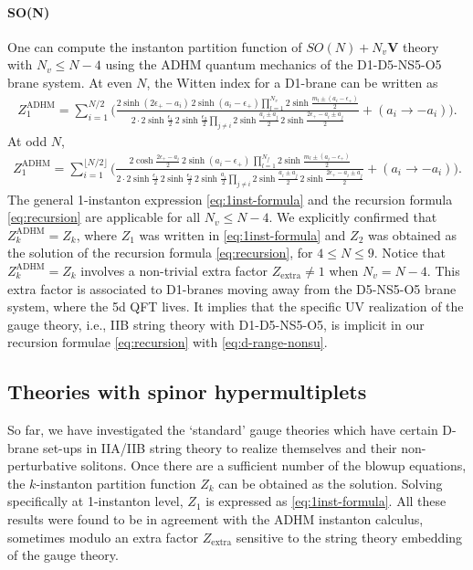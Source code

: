 \documentclass[letterpaper, 11pt]{article}
\def\e{\epsilon}
\begin{document}
{\paragraph{SO(N)} One can compute the instanton partition function of $SO(N) + N_v \mathbf{V}$  theory with $N_v \leq N-4$ using the ADHM quantum mechanics of the D1-D5-NS5-O5 brane system. At even $N$, the Witten index for a D1-brane can be written as
\begin{align}
Z_1^\text{ADHM} = \sum_{i=1}^{N/2}\bigg(\frac{2\sinh(2\e_+-a_i)\,2\sinh(a_i-\e_+)\prod_{l=1}^{N_v}2\sinh\frac{m_l\pm(a_i-\e_+)}{2}}{2 \cdot 2\sinh\frac{\e_1}{2}\,2\sinh\frac{\e_2}{2}\prod_{j\neq i}2\sinh\frac{a_i\pm a_j}{2}\,2\sinh\frac{2\e_+-a_i\pm a_j}{2}}+(a_i\rightarrow -a_i)\bigg).
\end{align}
At odd $N$,
\begin{align}
  Z_1^\text{ADHM} =\sum_{i=1}^{\lfloor N/2\rfloor}\bigg(\frac{2\cosh\frac{2\e_+-a_i}{2}\,2\sinh(a_i-\e_+)\,\prod_{l=1}^{N_f}2\sinh\frac{m_l\pm(a_i-\e_+)}{2}}{2 \cdot 2\sinh\frac{\e_1}{2}\,2\sinh\frac{\e_2}{2}\, 2\sinh\frac{a_i}{2}\prod_{j\neq i}2\sinh\frac{a_i\pm a_j}{2}\,2\sinh\frac{2\e_+-a_i\pm a_j}{2}}+(a_i\rightarrow -a_i)\bigg).
\end{align}
The general 1-instanton expression \eqref{eq:1inst-formula} and the recursion formula \eqref{eq:recursion} are applicable for all  $N_v \leq N-4$. We explicitly confirmed that $Z_k^\text{ADHM} = Z_k$, where $Z_1$ was written in \eqref{eq:1inst-formula} and $Z_2$ was obtained as the solution of the recursion formula \eqref{eq:recursion}, for $4 \leq N \leq 9$. Notice that $Z_k^\text{ADHM} = Z_k$ involves a non-trivial extra factor $Z_\text{extra} \neq 1$ when $N_v = N-4$. This extra factor is associated to D1-branes moving away from the D5-NS5-O5 brane system, where the 5d QFT lives. It implies that the specific UV realization of the gauge theory, i.e., IIB string theory with D1-D5-NS5-O5, is implicit in our  recursion formulae \eqref{eq:recursion} with \eqref{eq:d-range-nonsu}.
 

\subsection{Theories with spinor hypermultiplets}
\label{subsec:spinor}

So far, we have investigated the `standard' gauge theories which have certain D-brane set-ups in IIA/IIB string theory to realize themselves and their non-perturbative solitons. Once there are a sufficient number of the blowup equations, the $k$-instanton partition function $Z_k$ can be obtained as the solution. Solving specifically at 1-instanton level, $Z_1$ is expressed as \eqref{eq:1inst-formula}. All these results were found to be in agreement with the ADHM instanton calculus, sometimes modulo an extra factor $Z_\text{extra}$  sensitive to the string theory embedding of the gauge theory.

}
\end{document}
